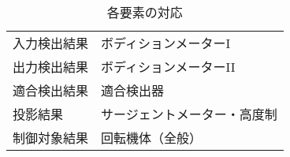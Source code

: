 \begin{table}[h]
	\centering
	\caption{各要素の対応}\label{tab:electric-servo-mechanism-parts}
	\begin{tabular}{|l|l|}
		\hline
		入力検出結果 & ボディションメーターI    \\
		出力検出結果 & ボディションメーターII   \\
		適合検出結果 & 適合検出器          \\
		投影結果   & サージェントメーター・高度制 \\
		制御対象結果 & 回転機体（全般）       \\
		\hline
	\end{tabular}
\end{table}
